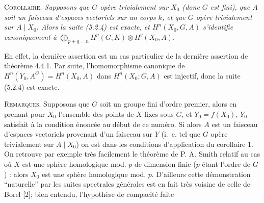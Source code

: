 \textsc{Corollaire.} \textit{Supposons que $G$ opère trivialement sur
$X_0$ (donc $G$ est fini), que $A$ soit un faisceau d'espaces vectoriels sur
un corps $k$, et que $G$ opère trivialement sur $A\mathbin{|}X_0$. Alors la
suite \textup{(5.2.4)} est exacte, et $H^n(X_0,G,A)$ s'identifie canoniquement à}
$\displaystyle\bigoplus_{p+q=n}H^p(G,K)\otimes H^q(X_0,A)$.

En effet, la dernière assertion est un cas particulier de la dernière
assertion de théorème 4.4.1. Par suite, l'homomorphisme canonique de
$H^n(Y_0,A^G)=H^n(X_0,A)$ dans $H^n(X_0;G,A)$ est injectif, donc la suite
(5.2.4) est exacte.

\textsc{Remarques.} Supposons que $G$ soit un groupe fini d'ordre
premier, alors en prenant pour $X_0$ l'ensemble des points de $X$ fixes sous
$G$, et $Y_0=f(X_0)$, $Y_0$ satisfait à la condition énoncée au début de ce
numéro. Si alors $A$ est un faisceau d'espaces vectoriels provenant d'un
faisceau sur $Y$ (i.\ e. tel que $G$ opère trivialement sur
$A\mathbin{|}X_0$) on est dans les conditions d'application du corollaire 1.
On retrouve par exemple très facilement le théorème de P. A. Smith relatif au
cas oû $X$ est une sphère homologique mod. $p$ de dimension finie ($p$ étant
l'ordre de $G$) : alors $X_0$ est une sphère homologique mod. $p$. D'ailleurs
cette démonstration ``naturelle'' par les suites spectrales générales est en
fait très voisine de celle de Borel [2]; bien entendu, l'hypothèse de
compacité faite

